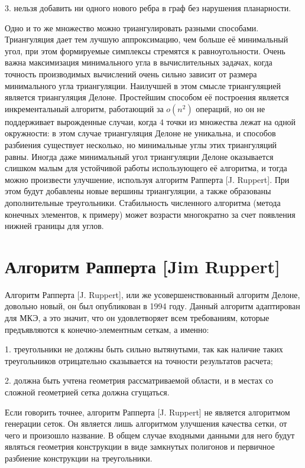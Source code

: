 \documentclass[14pt]{extreport}
\begin{document}
	3. нельзя добавить ни одного нового ребра в граф без нарушения планарности.

Одно и то же множество можно триангулировать разными способами. Триангуляция дает тем лучшую аппроксимацию, чем больше её минимальный угол, при этом формируемые симплексы стремятся к равноугольности. Очень важна максимизация минимального угла в вычислительных задачах, когда точность производимых вычислений очень сильно зависит от размера минимального угла триангуляции. Наилучшей в этом смысле триангуляцией является триангуляция Делоне. Простейшим способом её построения является инкрементальный алгоритм, работающий за $o(n^2)$ операций, но он не поддерживает вырожденные случаи, когда $4$ точки из множества лежат на одной окружности: в этом случае триангуляция Делоне не уникальна, и способов разбиения существует несколько, но минимальные углы этих триангуляций равны. Иногда даже минимальный угол триангуляции Делоне оказывается слишком малым для устойчивой работы использующего её алгоритма, и тогда можно произвести улучшение, используя алгоритм Рапперта [J. Ruppert]. При этом будут добавлены новые вершины триангуляции, а также образованы дополнительные треугольники. Стабильность численного алгоритма (метода конечных элементов, к примеру) может возрасти многократно за счет появления нижней границы для углов. 

\section{Алгоритм Рапперта [Jim Ruppert]}

Алгоритм Рапперта [J. Ruppert], или же усовершенствованный алгоритм Делоне, довольно новый, он был опубликован в 1994 году. Данный алгоритм адаптирован для МКЭ, а это значит, что он удовлетворяет всем требованиям, которые предъявляются к конечно-элементным сеткам, а именно:

1. треугольники не должны быть сильно вытянутыми, так как наличие таких треугольников отрицательно сказывается на точности результатов расчета;

2. должна быть учтена геометрия рассматриваемой области, и в местах со сложной геометрией сетка должна сгущаться.

Если говорить точнее, алгоритм Рапперта [J. Ruppert] не является алгоритмом генерации сеток. Он является лишь алгоритмом улучшения качества сетки, от чего и произошло название. В общем случае входными данными для него будут являться геометрия конструкции в виде замкнутых полигонов и первичное разбиение конструкции на треугольники. 
\end{document}
